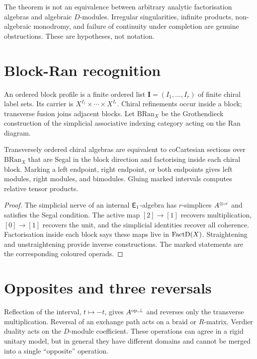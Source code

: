 \begin{warning}
The theorem is not an equivalence between arbitrary analytic factorisation algebras and algebraic \(D\)-modules.  Irregular singularities, infinite products, non-algebraic monodromy, and failure of continuity under completion are genuine obstructions.  These are hypotheses, not notation.
\end{warning}

\section{Block-Ran recognition}
An ordered block profile is a finite ordered list \(\mathbf I=(I_1,\ldots,I_r)\) of finite chiral label sets.  Its carrier is \(X^{I_1}\times\cdots\times X^{I_r}\).  Chiral refinements occur inside a block; transverse fusion joins adjacent blocks.  Let \(\mathrm{BRan}_X\) be the Grothendieck construction of the simplicial associative indexing category acting on the Ran diagram.

\begin{theorem}\label{thm:block-ran}
Transversely ordered chiral algebras are equivalent to coCartesian sections over \(\mathrm{BRan}_X\) that are Segal in the block direction and factorising inside each chiral block.  Marking a left endpoint, right endpoint, or both endpoints gives left modules, right modules, and bimodules.  Gluing marked intervals computes relative tensor products.
\end{theorem}
\begin{proof}
The simplicial nerve of an internal \(\mathsf E_1\)-algebra has \(r\)-simplices \(A^{\mathbin{\otimes_{!}} r}\) and satisfies the Segal condition.  The active map \([2]\to[1]\) recovers multiplication, \([0]\to[1]\) recovers the unit, and the simplicial identities recover all coherence.  Factorisation inside each block says these maps live in \(\operatorname{FactD}(X)\).  Straightening and unstraightening provide inverse constructions.  The marked statements are the corresponding coloured operads.
\end{proof}

\section{Opposites and three reversals}
Reflection of the interval, \(t\mapsto-t\), gives \(A^{\mathrm{op},\perp}\) and reverses only the transverse multiplication.  Reversal of an exchange path acts on a braid or \(R\)-matrix.  Verdier duality acts on the \(D\)-module coefficient.  These operations can agree in a rigid unitary model, but in general they have different domains and cannot be merged into a single ``opposite'' operation.

